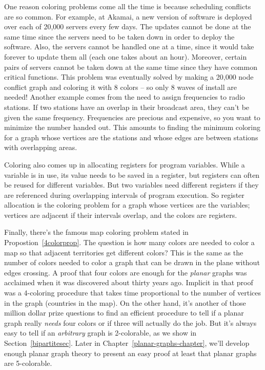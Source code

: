 One reason coloring problems come all the time is because scheduling
conflicts are so common.  For example, at Akamai, a new version of
software is deployed over each of 20,000 servers every few days.  The
updates cannot be done at the same time since the servers need to be taken
down in order to deploy the software.  Also, the servers cannot be handled
one at a time, since it would take forever to update them all (each one
takes about an hour).  Moreover, certain pairs of servers cannot be taken
down at the same time since they have common critical functions.  This
problem was eventually solved by making a 20,000 node conflict graph and
coloring it with 8 colors -- so only 8 waves of install are needed!
Another example comes from the need to assign frequencies to radio
stations.  If two stations have an overlap in their broadcast area, they
can't be given the same frequency.  Frequencies are precious and
expensive, so you want to minimize the number handed out.  This amounts to
finding the minimum coloring for a graph whose vertices are the stations
and whose edges are between stations with overlapping areas.

Coloring also comes up in allocating registers for program variables.
While a variable is in use, its value needs to be saved in a register, but
registers can often be reused for different variables.  But two variables
need different registers if they are referenced during overlapping
intervals of program execution.  So register allocation is the coloring
problem for a graph whose vertices are the variables; vertices are
adjacent if their intervals overlap, and the colors are registers.

Finally, there's the famous map coloring problem stated in
Propostion~\ref{4colorprop}.  The question is how many colors are needed
to color a map so that adjacent territories get different colors?  This is
the same as the number of colors needed to color a graph that can be drawn
in the plane without edges crossing.  A proof that four colors are enough
for the \emph{planar} graphs was acclaimed when it was discovered about
thirty years ago.  Implicit in that proof was a 4-coloring procedure that
takes time proportional to the number of vertices in the graph (countries
in the map).  On the other hand, it's another of those million dollar
prize questions to find an efficient procedure to tell if a planar graph
really \emph{needs} four colors or if three will actually do the job.  But
it's always easy to tell if an \emph{arbitrary} graph is 2-colorable, as
we show in Section~\ref{bipartitesec}.  Later in
Chapter~\ref{planar-graphs-chapter}, we'll develop enough planar graph
theory to present an easy proof at least that planar graphs are
5-colorable.

